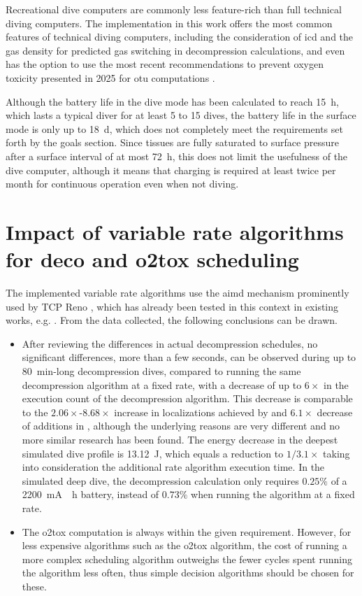 Recreational dive computers are commonly less feature-rich than full technical diving computers. The implementation in this work offers the most common features of technical diving computers, including the consideration of \gls{icd} and the gas density for predicted gas switching in decompression calculations, and even has the option to use the most recent recommendations to prevent oxygen toxicity presented in 2025 for \gls{otu} computations \cite{RevisedO2Tox2025}.

Although the battery life in the dive mode has been calculated to reach \SI{15}{\hour}, which lasts a typical diver for at least 5 to 15 dives, the battery life in the surface mode is only up to \SI{18}{\day}, which does not completely meet the requirements set forth by the goals section. 
Since tissues are fully saturated to surface pressure after a surface interval of at most \SI{72}{\hour}, this does not limit the usefulness of the dive computer, although it means that charging is required at least twice per month for continuous operation even when not diving.

\section{Impact of variable rate algorithms for \gls{deco} and \gls{o2tox} scheduling}
The implemented variable rate algorithms use the \gls{aimd} mechanism prominently used by TCP Reno \cite{aimd-1989}, which has already been tested in this context in existing works, e.g. \cite{2023-eth-energy-aware}.
From the data collected, the following conclusions can be drawn.

\begin{itemize}
    \item After reviewing the differences in actual decompression schedules, no significant differences, more than a few seconds, can be observed during up to \SI{80}{\minute}-long decompression dives, compared to running the same decompression algorithm at a fixed rate, with a decrease of up to $6\times$ in the execution count of the decompression algorithm.
    This decrease is comparable to the $2.06\times$-$8.68\times$ increase in localizations achieved by \cite{2023-eth-energy-aware} and $6.1\times$ decrease of additions in \cite{2020-dsra}, although the underlying reasons are very different and no more similar research has been found.
    The energy decrease in the deepest simulated dive profile is \SI{13.12}{\joule}, which equals a reduction to $1/3.1\times$ taking into consideration the additional rate algorithm execution time.
    In the simulated deep dive, the decompression calculation only requires $0.25\%$ of a \SI{2200}{\milli\ampere{}\hour} battery, instead of $0.73\%$ when running the algorithm at a fixed rate.
    \item The \gls{o2tox} computation is always within the given requirement. 
    However, for less expensive algorithms such as the \gls{o2tox} algorithm, the cost of running a more complex scheduling algorithm outweighs the fewer cycles spent running the algorithm less often, thus simple decision algorithms should be chosen for these. 
\end{itemize}

